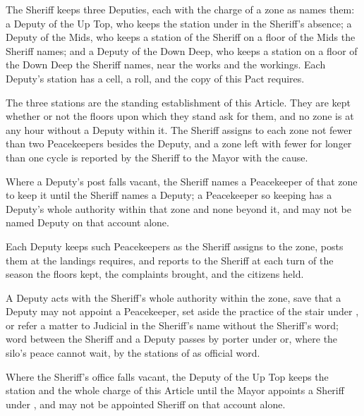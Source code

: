 \begin{clauses}
\item The Sheriff keeps three Deputies, each with the charge of a zone as  names them: a Deputy of the Up Top, who keeps the station under  in the Sheriff's absence; a Deputy of the Mids, who keeps a station of the Sheriff on a floor of the Mids the Sheriff names; and a Deputy of the Down Deep, who keeps a station on a floor of the Down Deep the Sheriff names, near the works and the workings. Each Deputy's station has a cell, a roll, and the copy of this Pact  requires.
\item The three stations are the standing establishment of this Article. They are kept whether or not the floors upon which they stand ask for them, and no zone is at any hour without a Deputy within it. The Sheriff assigns to each zone not fewer than two Peacekeepers besides the Deputy, and a zone left with fewer for longer than one cycle is reported by the Sheriff to the Mayor with the cause.
\item Where a Deputy's post falls vacant, the Sheriff names a Peacekeeper of that zone to keep it until the Sheriff names a Deputy; a Peacekeeper so keeping has a Deputy's whole authority within that zone and none beyond it, and may not be named Deputy on that account alone.
\item Each Deputy keeps such Peacekeepers as the Sheriff assigns to the zone, posts them at the landings  requires, and reports to the Sheriff at each turn of the season the floors kept, the complaints brought, and the citizens held.
\item A Deputy acts with the Sheriff's whole authority within the zone, save that a Deputy may not appoint a Peacekeeper, set aside the practice of the stair under , or refer a matter to Judicial in the Sheriff's name without the Sheriff's word; word between the Sheriff and a Deputy passes by porter under  or, where the silo's peace cannot wait, by the stations of  as official word.
\item Where the Sheriff's office falls vacant, the Deputy of the Up Top keeps the station and the whole charge of this Article until the Mayor appoints a Sheriff under , and may not be appointed Sheriff on that account alone.
\end{clauses}

